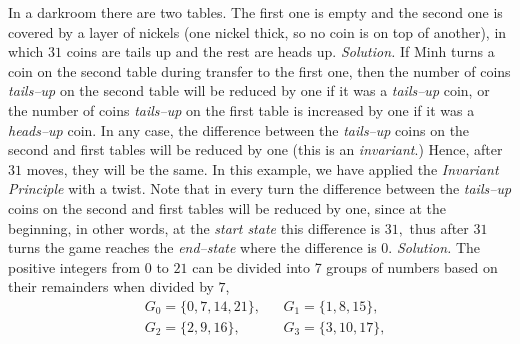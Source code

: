 \begin{multicols}{2}
{		In a darkroom there are two tables. The first one is empty and the second one is covered by a layer of nickels
		(one nickel thick, so no coin is on top of another), in which $31$ coins are tails up and the rest are heads up.}
	\vskip 0.1cm
	\vskip 0.2cm
	\textit{Solution.}
	If Minh turns a coin on the second table during transfer to the first one,
	then the number of coins \textit{tails--up} on the second table will be reduced by one if it was a \textit{tails--up} coin,
	or the number of coins \textit{tails--up} on the first table is increased by one if it was a \textit{heads--up} coin.
	In any case, the difference between the \textit{tails--up} coins on the second and first tables will be reduced by one
	(this is an \textit{invariant}.) Hence, after $31$ moves, they will be the same.
	\vskip 0.1cm
	In this example, we have applied the \textit{Invariant Principle} with a twist.
	Note that in every turn the difference between the \textit{tails--up} coins on the second and first tables will be reduced by one,
	since at the beginning, in other words, at the \textit{start state} this difference is $31,$
	thus after $31$ turns the game reaches the \textit{end--state} where the difference is $0.$
	\vskip 0.2cm
	\vskip 0.2cm
	\textit{Solution.}
	The positive integers from $0$ to $21$ can be divided into 7 groups of numbers based on their remainders when divided by $7$,
	\begin{align*}
		&G_0=\{0,7,14,21\}, &&G_1=\{1,8,15\},\\
		& G_2=\{2,9,16\}, &&G_3=\{3,10,17\},\\

\end{align*}
\end{multicols}
